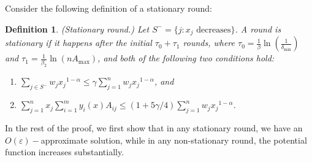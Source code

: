 \documentclass[11pt]{article}
\newtheorem{definition}[theorem]{Definition}
\begin{document}
Consider the following definition of a stationary round:

\begin{definition}\label{def:alpha<1-stationary-round}
(Stationary round.) Let $S^- = \{j: x_j \text{ decreases}\}$. A round is stationary if it happens after the initial $\tau_0 + \tau_1$ rounds, where $\tau_0 = \frac{1}{\beta}\ln(\frac{1}{\delta_{\min}})$ and $\tau_1 = \frac{1}{\beta_2}\ln(nA_{\max})$, and both of the following two conditions hold:
\begin{enumerate}
\item $\sum_{j\in S^-} w_j {x_j}^{1-\alpha}\leq \gamma \sum_{j=1}^n w_j {x_j}^{1-\alpha}$, and
\item $\sum_{j=1}^n x_j \sum_{i=1}^m y_i(x)A_{ij} \leq (1+5\gamma/4)\sum_{j=1}^n w_j {x_j}^{1-\alpha}$.
\end{enumerate}
\end{definition}

In the rest of the proof, we first show that in any stationary round, we have an $O(\varepsilon)-$approximate solution, while in any non-stationary round, the potential function increases substantially.
\end{document}
